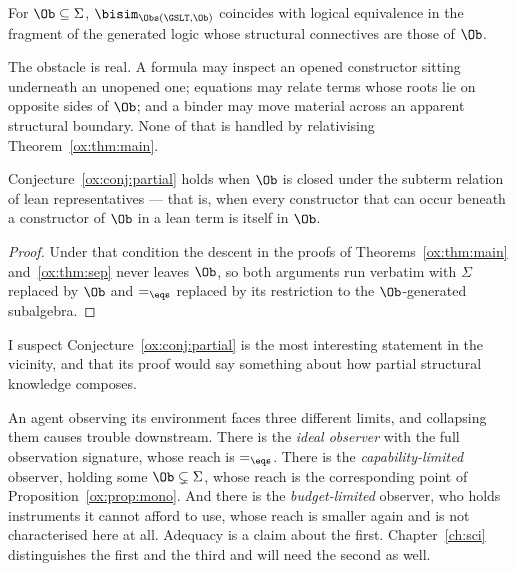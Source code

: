 \begin{conjecture}
\label{ox:conj:partial}
For $\Ob \subseteq \Sigma$, $\bisim_{\Obs(\GSLT,\Ob)}$ coincides with logical
equivalence in the fragment of the generated logic whose structural connectives are
those of $\Ob$.
\end{conjecture}

The obstacle is real. A formula may inspect an opened constructor sitting
underneath an unopened one; equations may relate terms whose roots lie on opposite
sides of $\Ob$; and a binder may move material across an apparent structural
boundary. None of that is handled by relativising Theorem~\ref{ox:thm:main}.

\begin{proposition}
\label{ox:prop:downward}
Conjecture~\ref{ox:conj:partial} holds when $\Ob$ is closed under the subterm
relation of lean representatives --- that is, when every constructor that can occur
beneath a constructor of $\Ob$ in a lean term is itself in $\Ob$.
\end{proposition}

\begin{proof}
Under that condition the descent in the proofs of Theorems~\ref{ox:thm:main}
and~\ref{ox:thm:sep} never leaves $\Ob$, so both arguments run verbatim with
$\Sigma$ replaced by $\Ob$ and $=_{\eqs}$ replaced by its restriction to the
$\Ob$-generated subalgebra.
\end{proof}

I suspect Conjecture~\ref{ox:conj:partial} is the most interesting statement in the
vicinity, and that its proof would say something about how partial structural
knowledge composes.

\begin{remark}
\label{ox:rem:threerestrictions}
An agent observing its environment faces three different limits, and collapsing
them causes trouble downstream. There is the \emph{ideal observer} with the full
observation signature, whose reach is $=_{\eqs}$. There is the
\emph{capability-limited} observer, holding some $\Ob \subsetneq \Sigma$, whose
reach is the corresponding point of Proposition~\ref{ox:prop:mono}. And there is
the \emph{budget-limited} observer, who holds instruments it cannot afford to use,
whose reach is smaller again and is not characterised here at all. Adequacy is a
claim about the first. Chapter~\ref{ch:sci} distinguishes the first and the third
and will need the second as well.
\end{remark}

